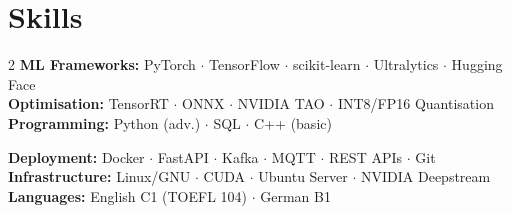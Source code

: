 \documentclass[10pt,a4paper]{article}
\begin{document}
\section{Skills}
\begin{multicols}{2}
\small\noindent
{\color{accent}\bfseries ML Frameworks:} PyTorch $\cdot$ TensorFlow $\cdot$ scikit-learn $\cdot$ Ultralytics $\cdot$ Hugging Face\\[1pt]
{\color{accent}\bfseries Optimisation:} TensorRT $\cdot$ ONNX $\cdot$ NVIDIA TAO $\cdot$ INT8/FP16 Quantisation\\[1pt]
{\color{accent}\bfseries Programming:} Python (adv.) $\cdot$ SQL $\cdot$ C++ (basic)

\columnbreak
{\color{accent}\bfseries Deployment:} Docker $\cdot$ FastAPI $\cdot$ Kafka $\cdot$ MQTT $\cdot$ REST APIs $\cdot$ Git\\[1pt]
{\color{accent}\bfseries Infrastructure:} Linux/GNU $\cdot$ CUDA $\cdot$ Ubuntu Server $\cdot$ NVIDIA Deepstream\\[1pt]
{\color{accent}\bfseries Languages:} English C1 (TOEFL 104) $\cdot$ German B1
\end{multicols}
\end{document}
